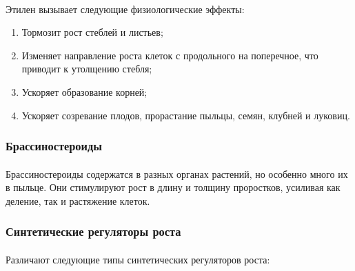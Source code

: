\paragraph*{}Этилен вызывает следующие физиологические эффекты:

\begin{enumerate}

	\item Тормозит рост стеблей и листьев;
	\item Изменяет направление роста клеток с продольного на поперечное, что приводит к утолщению стебля;
	\item Ускоряет образование корней;
	\item Ускоряет созревание плодов, прорастание пыльцы, семян, клубней и луковиц.

\end{enumerate}

\subsubsection*{Брассиностероиды}

\paragraph*{}Брассиностероиды содержатся в разных органах растений, но особенно много их в пыльце. Они стимулируют рост в длину и толщину проростков, усиливая как деление, так и растяжение клеток.

\subsubsection*{Синтетические регуляторы роста}

\paragraph*{}Различают следующие типы синтетических регуляторов роста:


